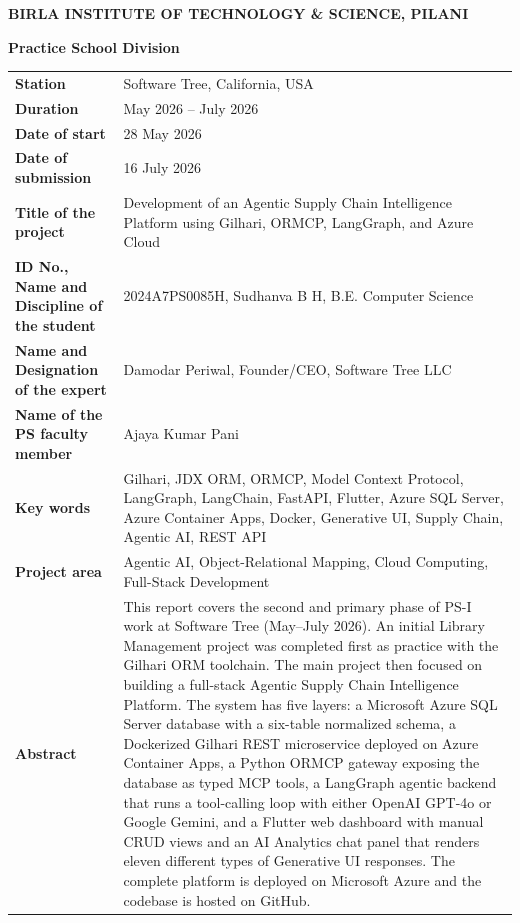 \documentclass{book}
\begin{document}
\thispagestyle{empty}

	\centerline{\bf BIRLA INSTITUTE OF TECHNOLOGY \& SCIENCE, PILANI}
	\vspace*{0.2cm}
	\centerline{\bf Practice School Division}
	\vspace*{0.3cm}
		\begin{tabular}{p{4.5cm} p{10.5cm}}
			\textbf{Station} & Software Tree, California, USA \\
			\textbf{Duration} & May 2026 -- July 2026 \\
			\textbf{Date of start} & 28 May 2026 \\
			\textbf{Date of submission} & 16 July 2026 \\
			\textbf{Title of the project} & Development of an Agentic Supply Chain Intelligence Platform using Gilhari, ORMCP, LangGraph, and Azure Cloud \\
			\textbf{ID No., Name and Discipline of the student} & 2024A7PS0085H, Sudhanva B H, B.E. Computer Science \\
			\textbf{Name and Designation of the expert} & Damodar Periwal, Founder/CEO, Software Tree LLC \\
			\textbf{Name of the PS faculty member} & Ajaya Kumar Pani \\
			\textbf{Key words} & Gilhari, JDX ORM, ORMCP, Model Context Protocol, LangGraph, LangChain, FastAPI, Flutter, Azure SQL Server, Azure Container Apps, Docker, Generative UI, Supply Chain, Agentic AI, REST API \\
			\textbf{Project area} & Agentic AI, Object-Relational Mapping, Cloud Computing, Full-Stack Development \\
			\textbf{Abstract} & This report covers the second and primary phase of PS-I work at Software Tree (May--July 2026). An initial Library Management project was completed first as practice with the Gilhari ORM toolchain. The main project then focused on building a full-stack Agentic Supply Chain Intelligence Platform. The system has five layers: a Microsoft Azure SQL Server database with a six-table normalized schema, a Dockerized Gilhari REST microservice deployed on Azure Container Apps, a Python ORMCP gateway exposing the database as typed MCP tools, a LangGraph agentic backend that runs a tool-calling loop with either OpenAI GPT-4o or Google Gemini, and a Flutter web dashboard with manual CRUD views and an AI Analytics chat panel that renders eleven different types of Generative UI responses. The complete platform is deployed on Microsoft Azure and the codebase is hosted on GitHub. \\

\end{tabular}
\end{document}
